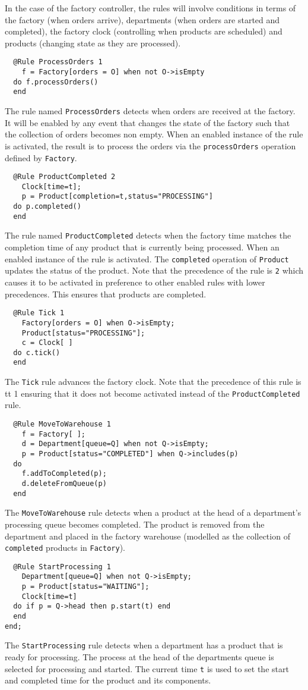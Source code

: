 \documentclass{article}
\begin{document}
In the case of the factory controller, the rules will involve conditions in terms
of the factory (when orders arrive), departments (when orders are started and completed),
the factory clock (controlling when products are scheduled) and products (changing state
as they are processed).
\begin{verbatim}
  @Rule ProcessOrders 1
    f = Factory[orders = O] when not O->isEmpty
  do f.processOrders()
  end
\end{verbatim}
The rule named {\tt ProcessOrders} detects when orders are received at the
factory. It will be enabled by any event that changes the state of the factory
such that the collection of orders becomes non empty. When an enabled instance
of the rule is activated, the result is to process the orders via the {\tt processOrders}
operation defined by {\tt Factory}.
\begin{verbatim}
  @Rule ProductCompleted 2
    Clock[time=t];
    p = Product[completion=t,status="PROCESSING"]
  do p.completed()
  end
\end{verbatim}
The rule named {\tt ProductCompleted} detects when the factory time matches the
completion time of any product that is currently being processed. When an
enabled instance of the rule is activated. The {\tt completed} operation
of {\tt Product} updates the status of the product. Note that the precedence of the
rule is {\tt 2} which causes it to be activated in preference to other enabled
rules with lower precedences. This ensures that products are completed.
\begin{verbatim}
  @Rule Tick 1
    Factory[orders = O] when O->isEmpty;
    Product[status="PROCESSING"];
    c = Clock[ ] 
  do c.tick()
  end
\end{verbatim}
The {\tt Tick} rule advances the factory clock. Note that the precedence of this
rule is {tt 1} ensuring that it does not become activated instead of the
{\tt ProductCompleted} rule.
\begin{verbatim}
  @Rule MoveToWarehouse 1
    f = Factory[ ];
    d = Department[queue=Q] when not Q->isEmpty;
    p = Product[status="COMPLETED"] when Q->includes(p)
  do
    f.addToCompleted(p);
    d.deleteFromQueue(p) 
  end
\end{verbatim}
The {\tt MoveToWarehouse} rule detects when a product at the head of a 
department's processing queue becomes completed. The product is removed from
the department and placed in the factory warehouse (modelled as the collection
of {\tt completed} products in {\tt Factory}).
\begin{verbatim}
  @Rule StartProcessing 1
    Department[queue=Q] when not Q->isEmpty;
    p = Product[status="WAITING"];
    Clock[time=t]
  do if p = Q->head then p.start(t) end
  end
end;
\end{verbatim}
The {\tt StartProcessing} rule detects when a department has a product
that is ready for processing. The process at the head of the departments
queue is selected for processing and started. The current time {\tt t}
is used to set the start and completed time for the product and its
components.
\end{document}

